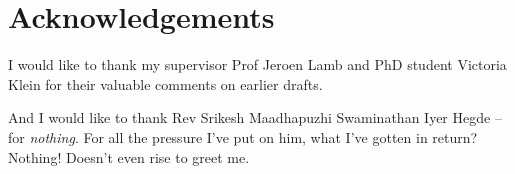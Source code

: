 \documentclass[12pt]{article}
\theoremstyle{definition}
\numberwithin{equation}{section}
\numberwithin{figure}{section}
\numberwithin{table}{section}
\begin{document}
\section{Acknowledgements}

I would like to thank my supervisor Prof Jeroen Lamb and PhD student Victoria Klein for their valuable comments on earlier drafts. 

And I would like to thank Rev Srikesh Maadhapuzhi Swaminathan Iyer Hegde -- for \emph{nothing}. For all the pressure I've put on him, what I've gotten in return? Nothing! Doesn't even rise to greet me. 

\pagebreak
\printbibliography[heading=bibintoc, title={References}]
\end{document}
